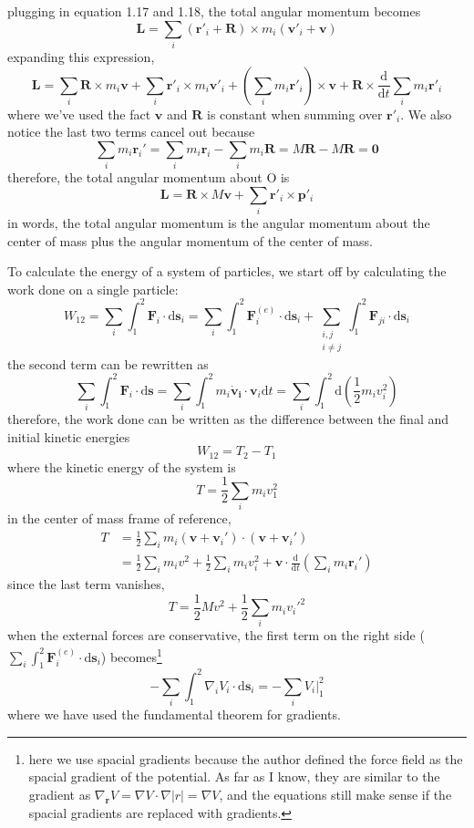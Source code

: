 \documentclass[]{article}
\numberwithin{equation}{section}
\begin{document}
plugging in equation 1.17 and 1.18, the total angular momentum becomes 
$$\mathbf L=\sum_i(\mathbf r'_i+\mathbf R)\times m_i(\mathbf v'_i+\mathbf v)$$
expanding this expression,
$$\mathbf L=\sum_i\mathbf R\times m_i\mathbf v+\sum_i\mathbf r'_i\times m_i\mathbf v'_i +\left(\sum_i m_i\mathbf r'_i\right)\times\mathbf v+\mathbf R\times\frac{\mathrm d}{\mathrm dt}\sum_i m_i\mathbf r'_i$$
where we've used the fact $\mathbf v$ and $\mathbf R$ is constant when summing over $\mathbf r'_i$. We also notice the last two terms cancel out because 
$$\sum_i m_i \mathbf r_i'=\sum_i m_i\mathbf r_i -\sum_i m_i\mathbf R=M\mathbf R-M\mathbf R=\mathbf 0$$
therefore, the total angular momentum about O is 
\begin{equation}\boxed{\mathbf L=\mathbf R\times M\mathbf v+\sum_i\mathbf r'_i\times\mathbf p'_i}\end{equation}
in words, the total angular momentum is the angular momentum about the center of mass plus the angular momentum of the center of mass.

To calculate the energy of a system of particles, we start off by calculating the work done on a single particle:
\begin{equation}W_{12}=\sum_i\int^2_1\mathbf F_i\cdot\mathrm d\mathbf s_i=\sum_i\int^2_1\mathbf F^{(e)}_i\cdot\mathrm d\mathbf s_i+\sum_{\substack{i,j\\i\ne j}}\int^2_1\mathbf F_{ji}\cdot\mathrm d\mathbf s_i\end{equation}
the second term can be rewritten as 
$$\sum_i\int^2_1\mathbf F_i\cdot\mathrm d\mathbf s=\sum_i\int^2_1m_i\mathbf{\dot v_i}\cdot\mathbf v_i\mathrm dt=\sum_i\int^2_1\mathrm d\left(\frac 12 m_iv_i^2\right)$$
therefore, the work done can be written as the difference between the final and initial kinetic energies
$$W_{12}=T_2-T_1$$
where the kinetic energy of the system is 
\begin{equation}T=\frac 12\sum_i m_iv_1^2\end{equation}
in the center of mass frame of reference,
\begin{align*}
	T&=\frac 12\sum_i m_i(\mathbf v+\mathbf v_i')\cdot(\mathbf v+\mathbf v_i')\\
	&=\frac 12\sum_i m_iv^2+\frac 12\sum_i m_iv_i^2+\mathbf v\cdot\frac{\mathrm d}{\mathrm dt}\left(\sum_i m_i\mathbf r_i'\right)
\end{align*}
since the last term vanishes, 
\begin{equation}\boxed{T=\frac 12Mv^2+\frac 12\sum_i m_iv_i'^2}\end{equation}
when the external forces are conservative, the first term on the right side ($\sum_i\int^2_1\mathbf F_i^{(e)}\cdot\mathrm d\mathbf s_i$) becomes\footnote{here we use spacial gradients because the author defined the force field as the spacial gradient of the potential. As far as I know, they are similar to the gradient as $\nabla_{\mathbf r}V=\nabla V\cdot\nabla|r|=\nabla V$, and the equations still make sense if the spacial gradients are replaced with gradients.}
$$-\sum_i\int^2_1\nabla_iV_i\cdot\mathrm d\mathbf s_i=-\sum_iV_i\Bigr\rvert^2_1$$
where we have used the fundamental theorem for gradients.
\end{document}
